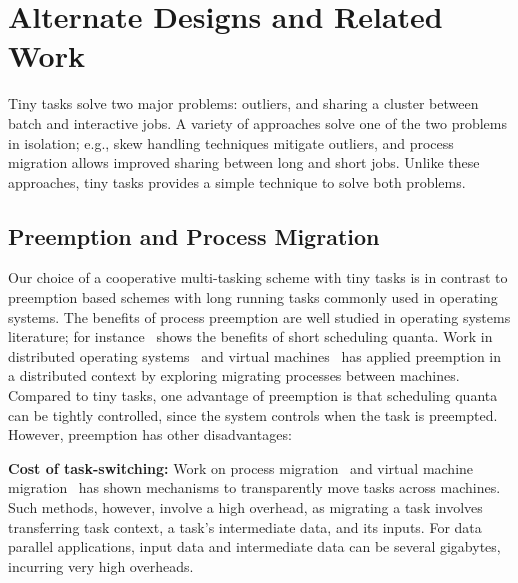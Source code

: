 \section{Alternate Designs and Related Work}
\label{sec:alternate}

Tiny tasks solve two major problems: outliers, and sharing
a cluster between batch and interactive jobs. A variety of
approaches solve one of the two problems in isolation; e.g., skew handling
techniques mitigate outliers, and process migration allows improved
sharing between long and short jobs.  Unlike these approaches, tiny tasks
provides a simple technique to solve both problems.

\subsection{Preemption and Process Migration}
\label{sec:preemption}

Our choice of a cooperative multi-tasking scheme with tiny tasks 
is in contrast to preemption based schemes with long running tasks commonly used 
in operating systems. The benefits of process preemption are well studied in operating
systems literature; for instance~\cite{sherman1972trace} shows the benefits
of short scheduling quanta. Work in distributed
operating systems~\cite{douglis1991transparent,milojivcic2000process,rozier1991overview} and virtual machines~\cite{tanenbaum1990experiences}
has applied preemption in a distributed context by exploring migrating
processes between machines.
Compared to tiny tasks, one advantage of preemption is that scheduling quanta
can be tightly controlled, since the system controls
when the task is preempted. However, preemption has other disadvantages:

\vspace{4pt}\noindent\textbf{Cost of task-switching:}
Work on process
migration~\cite{douglis1991transparent,milojivcic2000process} and virtual
machine migration~\cite{clark2005live} has shown mechanisms to transparently
move tasks across machines. Such methods, however, involve a high overhead, as
migrating a task involves transferring task context, a task's intermediate
data, and its inputs. For data parallel applications, input data and intermediate
data can be several gigabytes, incurring very high overheads.


